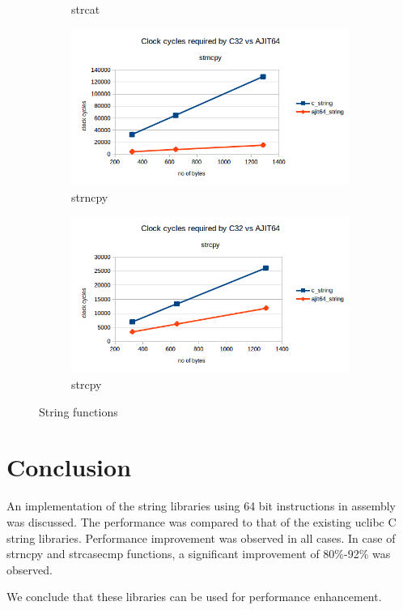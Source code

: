 \documentclass[12pt]{article}
\begin{document}
\begin{figure}[H]
\begin{subfigure}[b]{0.4\textwidth}
         \caption{strcat}
     \end{subfigure}
       \hfill
     \begin{subfigure}[b]{0.4\textwidth}
         \centering
         \includegraphics[width=\textwidth]{strncpy.png}
         \caption{strncpy}
         \end{subfigure}
       \hfill
     \begin{subfigure}[b]{0.4\textwidth}
         \centering
         \includegraphics[width=\textwidth]{strcpy.png}
         \caption{strcpy}
     \end{subfigure}
        \caption{String functions}
        \label{fig:three graphs}
\end{figure}

\newpage

\section{Conclusion}
An implementation of the string libraries using 64 bit instructions in assembly was discussed. The performance was compared to that of the existing uclibc C string libraries.
\newline
Performance improvement was observed in all cases. In case of strncpy and strcasecmp functions, a 
significant improvement of 80\%-92\% was observed.
\newline

We conclude that these libraries can be used for performance enhancement.

 
\end{document}

